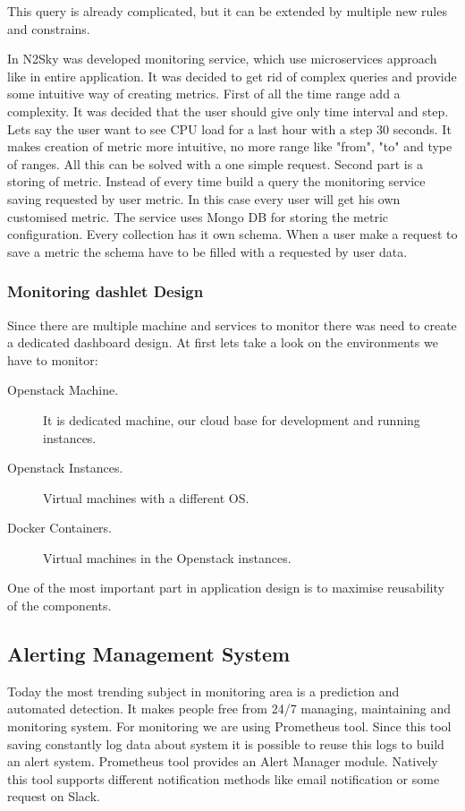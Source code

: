 This query is already complicated, but it can be extended by multiple new rules and constrains. 

In N2Sky was developed monitoring service, which use microservices approach like in entire application. It was decided to get rid of complex queries and provide some intuitive way of creating metrics. 
First of all the time range add a complexity. It was decided that the user should give only time interval and step. Lets say the user want to see CPU load for a last hour with a step 30 seconds. It makes creation of metric more intuitive, no more range like "from", "to" and type of ranges. All this can be solved with a one simple request. 
Second part is a storing of metric. Instead of every time build a query the monitoring service saving requested by user metric. In this case every user will get his own customised metric. 
The service uses Mongo DB for storing the metric configuration. Every collection has it own schema. When a user make a request to save a metric the schema have to be filled with a requested by user data.

\subsubsection{Monitoring dashlet Design}\label{Monitoring dashlet Design}

Since there are multiple machine and services to monitor there was need to create a dedicated dashboard design.  At first lets take a look on the environments we have to monitor: 
\begin{description}
\item[Openstack Machine.]  It is dedicated machine, our cloud base for development and running instances.
\item[Openstack Instances.]   Virtual machines with a different OS.
\item[Docker Containers.]  Virtual machines in the Openstack instances.
\end{description}

One of the most important part in application design is to maximise reusability of the components. 


\subsection{Alerting Management System}\label{Alerting Management System}

Today the most trending subject in monitoring area is a prediction and automated detection. It makes people free from 24/7 managing, maintaining and monitoring system.
For monitoring we are using Prometheus tool. Since this tool saving constantly log data about system it is possible to reuse this logs to build an alert system. 
Prometheus tool provides an Alert Manager module. Natively this tool supports different notification methods like email notification or some request on Slack. 

